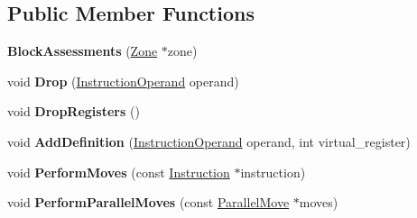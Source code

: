 \subsection*{Public Member Functions}
\begin{DoxyCompactItemize}
\item 
{\bfseries Block\+Assessments} (\hyperlink{classv8_1_1internal_1_1_zone}{Zone} $\ast$zone)\hypertarget{classv8_1_1internal_1_1compiler_1_1_block_assessments_a700e4a6d5b772dd3227058d09d8e2afd}{}\label{classv8_1_1internal_1_1compiler_1_1_block_assessments_a700e4a6d5b772dd3227058d09d8e2afd}

\item 
void {\bfseries Drop} (\hyperlink{classv8_1_1internal_1_1compiler_1_1_instruction_operand}{Instruction\+Operand} operand)\hypertarget{classv8_1_1internal_1_1compiler_1_1_block_assessments_af426cc23b18a87d752c7a0d603ff902a}{}\label{classv8_1_1internal_1_1compiler_1_1_block_assessments_af426cc23b18a87d752c7a0d603ff902a}

\item 
void {\bfseries Drop\+Registers} ()\hypertarget{classv8_1_1internal_1_1compiler_1_1_block_assessments_adc89da8c1bc90dd088292ca2d0412f7f}{}\label{classv8_1_1internal_1_1compiler_1_1_block_assessments_adc89da8c1bc90dd088292ca2d0412f7f}

\item 
void {\bfseries Add\+Definition} (\hyperlink{classv8_1_1internal_1_1compiler_1_1_instruction_operand}{Instruction\+Operand} operand, int virtual\+\_\+register)\hypertarget{classv8_1_1internal_1_1compiler_1_1_block_assessments_a64c6a0b81ec94e830a85773a2bf3bd89}{}\label{classv8_1_1internal_1_1compiler_1_1_block_assessments_a64c6a0b81ec94e830a85773a2bf3bd89}

\item 
void {\bfseries Perform\+Moves} (const \hyperlink{classv8_1_1internal_1_1compiler_1_1_instruction}{Instruction} $\ast$instruction)\hypertarget{classv8_1_1internal_1_1compiler_1_1_block_assessments_a63528cb219f683bfde6d5f40d893e5dc}{}\label{classv8_1_1internal_1_1compiler_1_1_block_assessments_a63528cb219f683bfde6d5f40d893e5dc}

\item 
void {\bfseries Perform\+Parallel\+Moves} (const \hyperlink{classv8_1_1internal_1_1compiler_1_1_parallel_move}{Parallel\+Move} $\ast$moves)\hypertarget{classv8_1_1internal_1_1compiler_1_1_block_assessments_a37a06801540f257333623693a349743d}{}\label{classv8_1_1internal_1_1compiler_1_1_block_assessments_a37a06801540f257333623693a349743d}


\end{DoxyCompactItemize}
